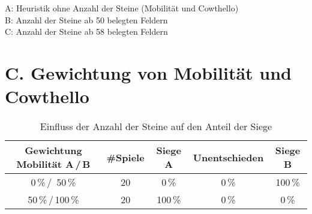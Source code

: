 \small{
A: Heuristik ohne Anzahl der Steine (Mobilität und Cowthello) \\
B: Anzahl der Steine ab 50 belegten Feldern \\
C: Anzahl der Steine ab 58 belegten Feldern}

\pagebreak

\section*{C. Gewichtung von Mobilität und Cowthello}
 
\setcounter{table}{0}
\renewcommand{\thetable}{C\arabic{table}}

\begin{table}[hb]
\centering
\begin{tabular}{c|c|ccc}
\hline
Gewichtung Mobilität A\,/\,B & \#Spiele & Siege A & Unentschieden & Siege B \\
\hline
   0\,\%\,/\, 50\,\% & 20 &  0\,\% &  0\,\% &100\,\% \\
  50\,\%\,/\,100\,\% & 20 &100\,\% &  0\,\% &  0\,\% \\
\hline
\end{tabular}
\caption{Einfluss der Anzahl der Steine auf den Anteil der Siege}
\label{table:combinedweighting}
\end{table}

\pagebreak

